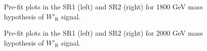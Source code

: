 \begin{figure}[H]
  \centering
  \caption{Pre-fit plots in the SR1 (left) and SR2 (right) for 1800 GeV mass hypothesis of $W'_{\text{R}}$ signal.}
  \label{fig:Prefit_WpRH1800_Asimov}
\end{figure}
\begin{figure}[H]
  \centering
  \caption{Pre-fit plots in the SR1 (left) and SR2 (right) for 2000 GeV mass hypothesis of $W'_{\text{R}}$ signal.}
  \label{fig:Prefit_WpRH2000_Asimov}
\end{figure}
